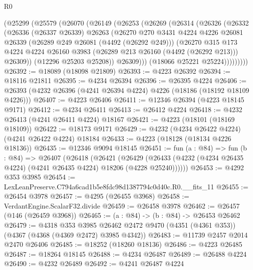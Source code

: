 \begin{lexlean}{R0}
\begin{coremodule}
        (@25299
          (@25579
            (@26070
              (@26149
                (@26253
                  (@26269
                    (@26314
                      (@26326
                        (@26332
                          (@26336
                            (@26337 @26339)
                            @26263
                            (@26270
                              @270
                              @3431
                              @4224
                              @4226
                              @26081
                              @26339
                              (@26289 @249 @26081 (@4492 (@26292 @249)))
                              (@26270
                                @315
                                @173
                                @4224
                                @4224
                                @26160
                                @3983
                                (@26289 @213 @26160 (@4492 (@26292 @213)))
                                @26309))
                            (@12296 @25203 @25208))
                          @26309)))
                    (@18066 @25221 @25224)))))))))
@26392 := @18089 (@18098 @21809)
@26393 := @4223 @26392
@26394 := @18116 @21811
@26395 := @4234 @26394
@26396 := @26395 @4224
@26406 := @26393 (@4232 @26396 (@4241 @26394 @4224) @4226 (@18186 (@18192 @18109 @4226)))
@26407 := @4223 @26406
@26411 := @12346 @26394 (@4223 @18145 @9171)
@26412 := @4234 @26411
@26413 := @26412 @4224
@26418 := @4232 @26413 (@4241 @26411 @4224) @18167
@26421 := @4223 (@18101 (@18169 @18109))
@26422 := @18173 @9171
@26429 := @4232 (@4234 @26422 @4224) (@4241 @26422 @4224) @18184
@26433 := @4223 (@18128 (@18134 @4226 @18136))
@26435 := @12346 @9094 @18145
@26451 := fun (a : @84) =>
  fun (b : @84) =>
  @26407
    (@26418
      (@26421
        (@26429 (@26433 (@4232 (@4234 @26435 @4224) (@4241 @26435 @4224) @18206 (@4228 @25240))))))
@26453 := @4292 @353 @3985
@26454 := LexLeanPreserve.C794a6cad1b5e8fdc98d1387794c0d40c.R0.__fits_11
@26455 := @26454 @3978
@26457 := @4295 (@26455 @3968)
@26458 := VerdantEngine.ScalarF32.divide
@26459 := @26458 @3978
@26462 := @26457 (@146 (@26459 @3968))
@26465 := (a : @84) -> (b : @84) -> @26453 @26462
@26479 := @4318
    @353
    @3985
    @26462
    @2472
    @9470
    (@4351 (@4361 @353))
    (@4367 (@4368 (@4369 @2472) @3985 @4342))
@26483 := @11739 @2457 @2014 @2470 @26406
@26485 := @18252 (@18260 @18136)
@26486 := @4223 @26485
@26487 := @18264 @18145
@26488 := @4234 @26487
@26489 := @26488 @4224
@26490 := @4232 @26489
@26492 := @4241 @26487 @4224

\end{coremodule}
\end{lexlean}
